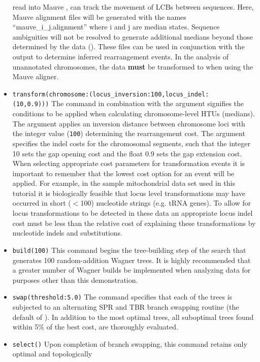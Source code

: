 \begin{itemize}
read into Mauve \cite{darlingetal2004}, can track the movement of LCBs between sequences. 
Here, Mauve  alignment files will be generated with the names ``mauve\_i\_j.alignment'' where i and j are median 
states. Sequence ambiguities will not be resolved to generate additional medians beyond those determined by the 
data (). These files can be used in conjunction with the  
 output to determine inferred rearrangement events. In the analysis of unannotated 
chromosomes, the data {\bf must} be transformed to  when using the Mauve aligner.
\item \texttt{transform(chromosome:(locus\_inversion:100,locus\_indel:\\(10,0.9)))}  The  
command in combination with the argument  signifies the conditions to be applied when calculating 
chromosome-level HTUs (medians).  The argument  applies an inversion distance 
between chromosome loci with the integer value (\texttt{100}) determining the rearrangement cost. The argument 
 specifies the indel costs for the chromosomal segments, such that the integer 10 
sets the gap opening cost and the float 0.9 sets the gap extension cost.  When selecting appropriate cost parameters
for transformation events it is important to remember that the lowest cost option for an event will be applied. For example,
in the sample mitochondrial data set used in this tutorial it is biologically feasible that locus level transformations may 
have occurred in short ($<$100) nucleotide strings (e.g. tRNA genes). To allow for locus transformations to be detected
in these data an appropriate locus indel cost must be less than the relative cost of explaining these transformations 
by nucleotide indels and substitutions.  
\item \texttt{build(100)} This command begins the tree-building step of the search that generates 100 random-addition 
Wagner trees. It is highly recommended that a greater number of Wagner builds be implemented when analyzing 
data for purposes other than this demonstration.
\item \texttt{swap(threshold:5.0)} The  command specifies that each of the trees is subjected to an 
alternating SPR and TBR branch swapping routine (the default of \poy). In addition to the most optimal trees, all suboptimal 
trees found within 5\% of the best cost, are thoroughly evaluated.
\item \texttt{select()} Upon completion of branch swapping, this command retains only optimal and topologically 

\end{itemize}

